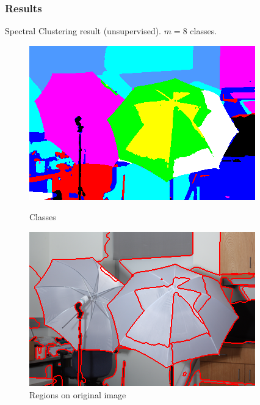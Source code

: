 \documentclass{beamer}
\begin{document}
\begin{frame}
  \frametitle{Results}
  Spectral Clustering result (unsupervised). $m = 8$ classes.
  \begin{figure}[ht]
    \begin{minipage}[b]{0.45\linewidth}
      \centering
      \includegraphics[width=\textwidth]{./Images/Umbrella/clustering.png}
      \caption{Classes}
    \end{minipage}
    \begin{minipage}[b]{0.45\linewidth}
      \centering
      \includegraphics[width=\textwidth]{./Images/Umbrella/segmentation.png}
      \caption{Regions on original image}
    \end{minipage}
  \end{figure}
\end{frame}
\end{document}
